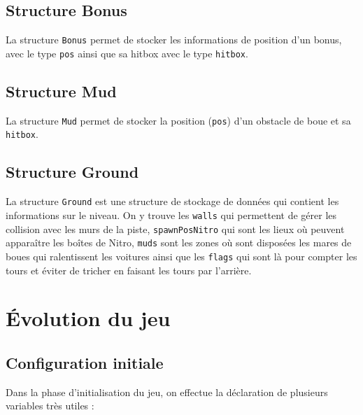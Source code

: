 \documentclass[11pt, final]{report}
\renewcommand{\tt}[1]{\texttt{#1}}
\begin{document}
\subsection{Structure Bonus}


La structure \tt{Bonus} permet de stocker les informations de position d'un bonus, avec le type \tt{pos} ainsi que sa hitbox avec le type \tt{hitbox}.
\\

\subsection{Structure Mud}


La structure \tt{Mud} permet de stocker la position (\tt{pos}) d'un obstacle de boue et sa \tt{hitbox}.
\\

\subsection{Structure Ground}


La structure \tt{Ground} est une structure de stockage de données qui contient les informations sur le niveau. On y trouve les \tt{walls} qui permettent de gérer les collision avec les murs de la piste, \tt{spawnPosNitro} qui sont les lieux où peuvent apparaître les boîtes de Nitro, \tt{muds} sont les zones où sont disposées les mares de boues qui ralentissent les voitures ainsi que les \tt{flags} qui sont là pour compter les tours et éviter de tricher en faisant les tours par l'arrière.
\\

\section{Évolution du jeu}

\subsection{Configuration initiale}


Dans la phase d'initialisation du jeu, on effectue la déclaration de plusieurs variables très utiles :
\end{document}
